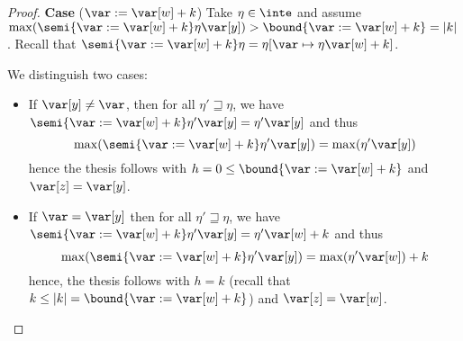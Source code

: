 \begin{proof}
  
  \medskip
  
  \noindent
  \textbf{Case} (\(\var := \var[w] + k\))
  Take \(\eta \in \inte\) and assume
  \(\max(\semi{\var := \var[w] + k}\eta \var[y]) > \bound{\var :=
    \var[w] + k} = |k|\).
  Recall that
  \(\semi{\var := \var[w] + k}\eta = \eta[\var \mapsto \eta \var[w] + k]\).
  
  We distinguish two cases:
  \begin{itemize}
    
  \item If \(\var[y] \neq \var\), then for all \(\eta' \sqsupseteq \eta\), we have
    \(\semi{\var := \var[w] + k}\eta' \var[y] = \eta' \var[y]\) and thus
    \begin{equation*}
      \max(\semi{\var := \var[w] + k}\eta' \var[y]) = \max(\eta' \var[y])
    \end{equation*}
    hence the thesis follows with
    \(h =0 \leq \bound{\var := \var[w] + k}\) and \(\var[z] = \var[y]\).
    
  \item 
    If \(\var = \var[y]\) then  for all \(\eta' \sqsupseteq \eta\), we have
    \(\semi{\var := \var[w] + k}\eta' \var[y] = \eta' \var[w] +
    k\) and thus
    \begin{equation*}
      \max(\semi{\var := \var[w] + k}\eta' \var[y]) = \max(\eta' \var[w]) +
      k
    \end{equation*}
    hence, the thesis follows with \(h = k\) (recall that
    \(k \leq |k| = \bound{\var := \var[w] + k}\)) and
    \(\var[z] = \var[w]\).
  \end{itemize}

  
  
  
    
    

\end{proof}

